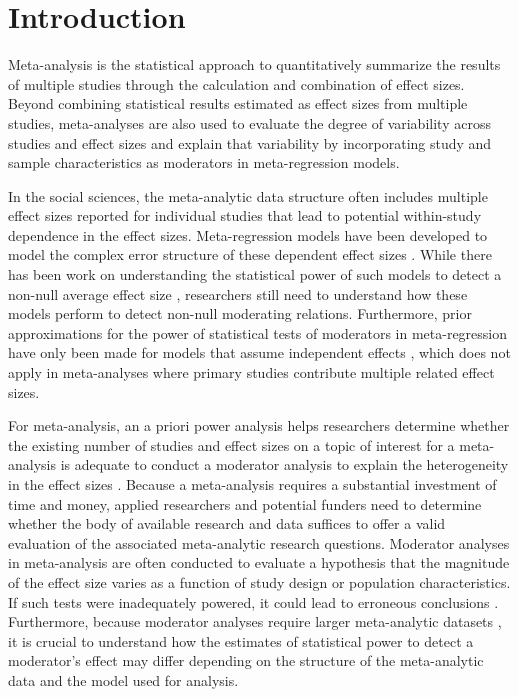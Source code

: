 \chapter{Introduction}


Meta-analysis is the statistical approach to quantitatively summarize the results of multiple studies through the calculation and combination of effect sizes. Beyond combining statistical results estimated as effect sizes from multiple studies, meta-analyses are also used to evaluate the degree of variability across studies and effect sizes and explain that variability by incorporating study and sample characteristics as moderators in meta-regression models. 

In the social sciences, the meta-analytic data structure often includes multiple effect sizes reported for individual studies that lead to potential within-study dependence in the effect sizes. Meta-regression models have been developed to model the complex error structure of these dependent effect sizes \autocite{vandennoortgate2013, hedges2010, viechtbauer2010a, sera2019, pustejovsky2022}. While there has been work on understanding the statistical power of such models to detect a non-null average effect size \autocite{vembye2023}, researchers still need to understand how these models perform to detect non-null moderating relations. Furthermore, prior approximations for the power of statistical tests of moderators in meta-regression have only been made for models that assume independent effects \autocite{hedges2004, jackson2017, valentine2010}, which does not apply in meta-analyses where primary studies contribute multiple related effect sizes. 

For meta-analysis, an a priori power analysis helps researchers determine whether the existing number of studies and effect sizes on a topic of interest for a meta-analysis is adequate to conduct a moderator analysis to explain the heterogeneity in the effect sizes \autocite{hedges2001}. Because a meta-analysis requires a substantial investment of time and money, applied researchers and potential funders need to determine whether the body of available research and data suffices to offer a valid evaluation of the associated meta-analytic research questions. Moderator analyses in meta-analysis are often conducted to evaluate a hypothesis that the magnitude of the effect size varies as a function of study design or population characteristics. If such tests were inadequately powered, it could lead to erroneous conclusions \autocite{hedges2004}. Furthermore, because moderator analyses require larger meta-analytic datasets \autocite{hedges2004}, it is crucial to understand how the estimates of statistical power to detect a moderator's effect may differ depending on the structure of the meta-analytic data and the model used for analysis. 

